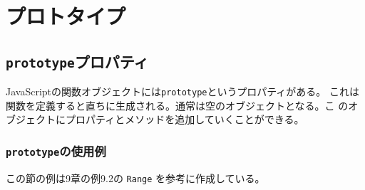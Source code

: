 \chapter{プロトタイプ}
\section{\protect\texttt{prototype}プロパティ}
JavaScriptの関数オブジェクトには\texttt{prototype}というプロパティがある。
これは関数を定義すると直ちに生成される。通常は空のオブジェクトとなる。こ
のオブジェクトにプロパティとメソッドを追加していくことができる。
\subsection{\protect\texttt{prototype}の使用例}
この節の例は\cite{JS6}9章の例9.2の \texttt{Range} を参考に作成している。
